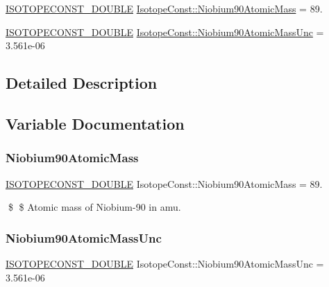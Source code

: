 \begin{DoxyCompactItemize}
\item 
\mbox{\hyperlink{group___isotope_const-_macros_ga8f45a7272ce02c0b4c65c44636ed719a}{I\+S\+O\+T\+O\+P\+E\+C\+O\+N\+S\+T\+\_\+\+D\+O\+U\+B\+LE}} \mbox{\hyperlink{group___isotope_const-_niobium-_nb90_ga710b82cdc4f1f294415609a42ee3144b}{Isotope\+Const\+::\+Niobium90\+Atomic\+Mass}} = 89.
\item 
\mbox{\hyperlink{group___isotope_const-_macros_ga8f45a7272ce02c0b4c65c44636ed719a}{I\+S\+O\+T\+O\+P\+E\+C\+O\+N\+S\+T\+\_\+\+D\+O\+U\+B\+LE}} \mbox{\hyperlink{group___isotope_const-_niobium-_nb90_ga99f455961d67abb17737a938b9459525}{Isotope\+Const\+::\+Niobium90\+Atomic\+Mass\+Unc}} = 3.\+561e-\/06
\end{DoxyCompactItemize}


\subsection{Detailed Description}


\subsection{Variable Documentation}
\mbox{\label{group___isotope_const-_niobium-_nb90_ga710b82cdc4f1f294415609a42ee3144b}} 
\subsubsection{\texorpdfstring{Niobium90\+Atomic\+Mass}{Niobium90AtomicMass}}
{\footnotesize\ttfamily \mbox{\hyperlink{group___isotope_const-_macros_ga8f45a7272ce02c0b4c65c44636ed719a}{I\+S\+O\+T\+O\+P\+E\+C\+O\+N\+S\+T\+\_\+\+D\+O\+U\+B\+LE}} Isotope\+Const\+::\+Niobium90\+Atomic\+Mass = 89.}

\$ \$ Atomic mass of Niobium-\/90 in amu. \mbox{\label{group___isotope_const-_niobium-_nb90_ga99f455961d67abb17737a938b9459525}} 
\subsubsection{\texorpdfstring{Niobium90\+Atomic\+Mass\+Unc}{Niobium90AtomicMassUnc}}
{\footnotesize\ttfamily \mbox{\hyperlink{group___isotope_const-_macros_ga8f45a7272ce02c0b4c65c44636ed719a}{I\+S\+O\+T\+O\+P\+E\+C\+O\+N\+S\+T\+\_\+\+D\+O\+U\+B\+LE}} Isotope\+Const\+::\+Niobium90\+Atomic\+Mass\+Unc = 3.\+561e-\/06}

